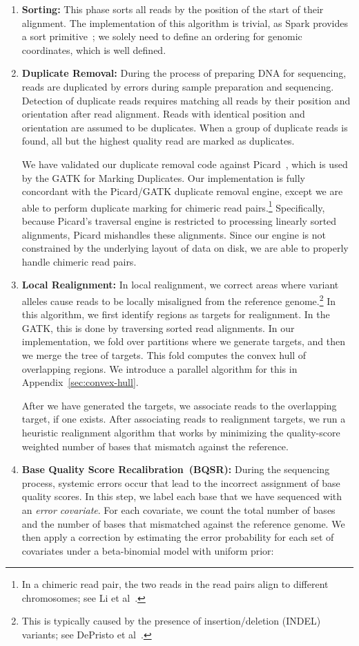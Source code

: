 \documentclass{acm_proc_article-sp}
\begin{document}
\begin{enumerate}
\item \textbf{Sorting:} This phase sorts all reads by the position of the start of their alignment. The implementation
of this algorithm is trivial, as Spark provides a sort primitive~\cite{zaharia10}; we solely need to define an
ordering for genomic coordinates, which is well defined.
\item \textbf{Duplicate Removal:} During the process of preparing DNA for sequencing, reads are duplicated by
errors during sample preparation and sequencing. Detection of duplicate reads requires matching all reads by their
position and orientation after read alignment. Reads with identical position and orientation are assumed to be
duplicates. When a group of duplicate reads is found, all but the highest quality read are marked as duplicates.

We have validated our duplicate removal code against Picard~\cite{picard}, which is used by the GATK
for Marking Duplicates. Our implementation is fully concordant with the Picard/GATK duplicate removal
engine, except we are able to perform duplicate marking for chimeric read pairs.\footnote{In a chimeric read pair,
the two reads in the read pairs align to different chromosomes; see Li et al~\cite{li10}.}
Specifically, because Picard's traversal engine is restricted to processing linearly sorted alignments,
Picard mishandles these alignments. Since our engine is not constrained by the underlying layout of data
on disk, we are able to properly handle chimeric read pairs.
\item \textbf{Local Realignment:} In local realignment, we correct areas where variant alleles cause reads to be
locally misaligned from the reference genome.\footnote{This is typically caused by the presence of
insertion/deletion (INDEL) variants; see DePristo et al~\cite{depristo11}.} In this algorithm, we first identify regions
as targets for realignment. In the GATK, this is done by traversing sorted read alignments. In our implementation,
we fold over partitions where we generate targets, and then we merge the tree of targets. This fold computes the convex
hull of overlapping regions. We introduce a parallel algorithm for this in Appendix~\ref{sec:convex-hull}.

After we have generated the targets, we associate reads to the overlapping target, if one exists. After
associating reads to realignment targets, we run a heuristic realignment algorithm that works by minimizing
the quality-score weighted number of bases that mismatch against the reference.
\item \textbf{Base Quality Score Recalibration~(BQSR):} During the sequencing process, systemic errors occur
that lead to the incorrect assignment of base quality scores. In this step, we label each base that we have
sequenced with an \emph{error covariate}. For each covariate, we count the total number of bases and the number
of bases that mismatched against the reference genome. We then apply a correction by estimating the error probability
for each set of covariates under a beta-binomial model with uniform prior:


\end{enumerate}
\end{document}
